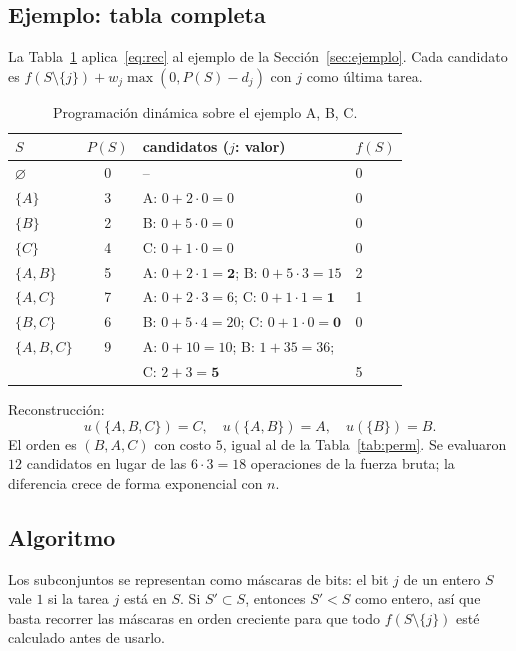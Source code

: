\documentclass[10pt,twocolumn,letterpaper]{article}
\begin{document}
\subsection{Ejemplo: tabla completa}

La Tabla~\ref{tab:dp} aplica~\eqref{eq:rec} al ejemplo de la
Sección~\ref{sec:ejemplo}. Cada candidato es
$f(S\setminus\{j\})+w_j\max(0,P(S)-d_j)$ con $j$ como última tarea.

\begin{table}[h]
\centering
\caption{Programación dinámica sobre el ejemplo A, B, C.}\label{tab:dp}
\footnotesize\setlength{\tabcolsep}{4pt}
\begin{tabular}{lcll}
\toprule
$S$ & $P(S)$ & candidatos ($j$: valor) & $f(S)$\\
\midrule
$\varnothing$ & 0 & -- & 0\\
$\{A\}$ & 3 & A: $0+2\cdot0=0$ & 0\\
$\{B\}$ & 2 & B: $0+5\cdot0=0$ & 0\\
$\{C\}$ & 4 & C: $0+1\cdot0=0$ & 0\\
$\{A,B\}$ & 5 & A: $0+2\cdot1=\mathbf{2}$;\; B: $0+5\cdot3=15$ & 2\\
$\{A,C\}$ & 7 & A: $0+2\cdot3=6$;\; C: $0+1\cdot1=\mathbf{1}$ & 1\\
$\{B,C\}$ & 6 & B: $0+5\cdot4=20$;\; C: $0+1\cdot0=\mathbf{0}$ & 0\\
$\{A,B,C\}$ & 9 & A: $0+10=10$;\; B: $1+35=36$; & \\
 & & C: $2+3=\mathbf{5}$ & 5\\
\bottomrule
\end{tabular}
\end{table}

Reconstrucción:
\[
u(\{A,B,C\})=C,\quad u(\{A,B\})=A,\quad u(\{B\})=B.
\]
El orden es $(B,A,C)$ con costo $5$, igual al de la Tabla~\ref{tab:perm}. Se
evaluaron $12$ candidatos en lugar de las $6\cdot3=18$ operaciones de la fuerza
bruta; la diferencia crece de forma exponencial con $n$.

\subsection{Algoritmo}

Los subconjuntos se representan como máscaras de bits: el bit $j$ de un entero
$S$ vale $1$ si la tarea $j$ está en $S$. Si $S'\subset S$, entonces $S'<S$
como entero, así que basta recorrer las máscaras en orden creciente para que
todo $f(S\setminus\{j\})$ esté calculado antes de usarlo.
\end{document}
